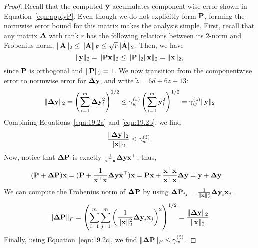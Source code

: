 \begin{proof}
	Recall that the computed $\hat{\mathbf{y}}$ accumulates component-wise error shown in Equation~\ref{eqn:applyP}.
	Even though we do not explicitly form $\mathbf{P}$, forming the normwise error bound for this matrix makes the analysis simple.
	First, recall that any matrix $\mathbf{A}$ with rank $r$ has the following relations between its 2-norm and Frobenius norm,
	$\|\mathbf{A}\|_2\leq\|\mathbf{A}\|_F\leq\sqrt{r}\|\mathbf{A}\|_2$.
	Then, we have 
	\begin{equation}
	\label{eqn:19.2a}
	\|\bb{y}\|_2 = \|\bb{P x}\|_2 \leq \|\bb{P}\|_2 \|\bb{x}\|_2 = \|\bb{x}\|_2,
	\end{equation}
	since $\mathbf{P}$ is orthogonal and $\|\mathbf{P}\|_2=1$.
	We now transition from the componentwise error to normwise error for $\mathbf{\Delta y}$, and write $\tilde{z} = 6d+6z+13$:
	\begin{equation}
	\label{eqn:19.2b}
	\|\bb{\Delta y}\|_2 = \left(\sum_{i=1}^m \bb{\Delta y}_i^2\right)^{1/2} \leq \gamma_w^{(\tilde{z})}\left(\sum_{i=1}^m \bb{y}_i^2\right)^{1/2} =  \gamma_w^{(\tilde{z})}\|\bb{y}\|_2
	\end{equation}
	Combining Equations~\ref{eqn:19.2a} and \ref{eqn:19.2b}, we find
	\begin{equation}
	\frac{\|\bb{\Delta y}\|_2}{\|\bb{x}\|_2} \leq \gamma_w^{(\tilde{z})}. \label{eqn:19.2c}
	\end{equation}
	Now, notice that $\mathbf{\Delta P}$ is exactly $\frac{1}{\mathbf{x}^{\top}\mathbf{x}}\mathbf{\Delta y}\mathbf{x}^{\top}$; thus, 
	\begin{align*}
	(\bb{P}+\bb{\Delta P}) \bb{x} &= (\bb{P}+\frac{1}{\bb{x}^{\top}\bb{x}}\bb{\Delta y}\bb{x}^{\top})\bb{x}    %
=\bb{P}\bb{x}  + \frac{\bb{x}^{\top}\bb{x}}{\bb{x}^{\top}\bb{x}}\bb{\Delta y} = \bb{y} + \bb{\Delta y}
	\end{align*}
	We can compute the Frobenius norm of $\mathbf{\Delta P}$ by using $\mathbf{\Delta P}_{ij} = \frac{1}{\|\mathbf{x}\|_2^2}\mathbf{\Delta y}_i\mathbf{x}_j$.
	\begin{align*}
	\|\bb{\Delta P}\|_F %
	= \left(\sum_{i=1}^m\sum_{j=1}^m\left(\frac{1}{\|\bb{x}\|_2^2}\bb{\Delta y}_i\bb{x}_j\right)^2\right)^{1/2} %
        =  \frac{\|\bb{\Delta y}\|_2}{\|\bb{x}\|_2}
	\end{align*}
	Finally, using Equation~\ref{eqn:19.2c}, we find $\|\mathbf{\Delta P}\|_F \leq \gamma_w^{(\tilde{z})}$.
\end{proof}

